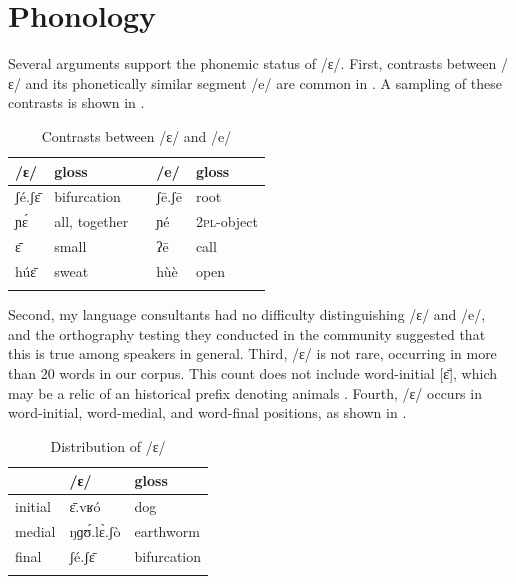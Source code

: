 \documentclass[output=paper,colorlinks,citecolor=brown]{langscibook}
\begin{document}
\section{Phonology}\label{sec:olson:2}

Several arguments support the phonemic status of /ɛ/. First, contrasts between /ɛ/ and its phonetically similar segment /e/ are common in . A sampling of these contrasts is shown in .

\begin{table}
\caption{Contrasts between /ɛ/ and /e/}
\label{tab:olson:4}
    \begin{tabularx}{.8\textwidth}{llXll}
    \lsptoprule
        /ɛ/ & gloss && /e/  & gloss\\
    \midrule
        ʃé.ʃɛ̄ & bifurcation && ʃē.ʃē & root\\
        ɲɛ́  & all, together && ɲé    & \textsc{2pl}-object\\
        ɛ̄     & small       && ʔē    & call\\
        húɛ̄   & sweat      & & hùè   & open\\
    \lspbottomrule
    \end{tabularx}
\end{table}

Second, my language consultants had no difficulty distinguishing /ɛ/ and /e/, and the orthography testing they conducted in the  community suggested that this is true among  speakers in general. Third, /ɛ/ is not rare, occurring in more than 20 words in our corpus. This count does not include word-initial [ɛ̄], which may be a relic of an historical prefix denoting animals \citep[13]{Greenberg1970}. Fourth, /ɛ/ occurs in word-initial, word-medial, and word-final positions, as shown in .

\begin{table}
\caption{Distribution of /ɛ/}
\label{tab:olson:5}
    \begin{tabularx}{.8\textwidth}{XXX}
    \lsptoprule
                    & /ɛ/ & gloss\\
    \midrule
        initial     & ɛ̄.vʁó & dog\\
        medial      & ŋɡʊ́.lɛ̀.ʃò  & earthworm\\
        final       & ʃé.ʃɛ̄   & bifurcation\\
    \lspbottomrule
 \end{tabularx}
\end{table}
\end{document}
